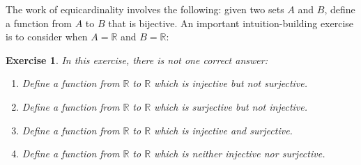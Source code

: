 \documentclass{book}
\newcounter{ekcounter}%
\theoremstyle{ekimcustom}
\newtheorem{exercise}[ekcounter]{Exercise}
\begin{document}
The work of equicardinality involves the following: given two sets $A$ and $B$, define a function from $A$ to $B$ that is bijective. An important intuition-building exercise is to consider when $A=\mathbb{R}$ and $B=\mathbb{R}$:
\begin{exercise}
In this exercise, there is not \emph{one} correct answer:
\begin{enumerate}
\item Define a function from $\mathbb{R}$ to $\mathbb{R}$ which is injective but not surjective.
\item Define a function from $\mathbb{R}$ to $\mathbb{R}$ which is surjective but not injective.
\item Define a function from $\mathbb{R}$ to $\mathbb{R}$ which is injective and surjective.
\item Define a function from $\mathbb{R}$ to $\mathbb{R}$ which is neither injective nor surjective.
\end{enumerate}
\end{exercise}
\end{document}
